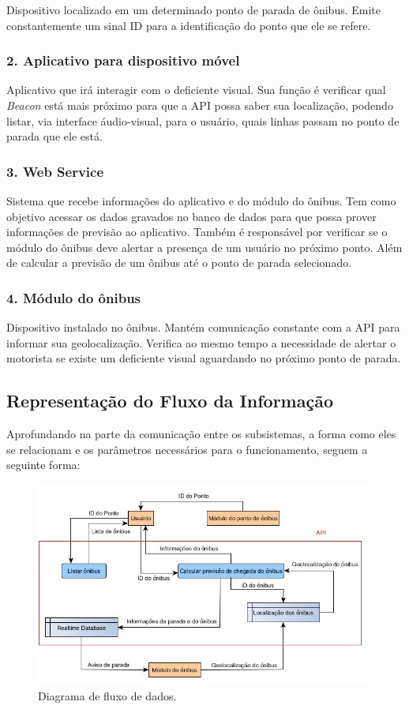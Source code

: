 \documentclass[
	12pt,				%
	oneside,			%
	a4paper,			%
	brazil				%
]{abntex2}
\begin{document}
Dispositivo localizado em um determinado ponto de parada de ônibus. Emite constantemente um sinal ID para a identificação do ponto que ele se refere.

\subsubsection*{2. Aplicativo para dispositivo móvel}

Aplicativo que irá interagir com o deficiente visual. Sua função é verificar qual \textit{Beacon} está mais próximo para que a API possa saber sua localização, podendo listar, via interface áudio-visual, para o usuário, quais linhas passam no ponto de parada que ele está.

\subsubsection*{3. Web Service}

Sistema que recebe informações do aplicativo e do módulo do ônibus. Tem como objetivo acessar os dados gravados no banco de dados para que possa prover informações de previsão ao aplicativo. Também é responsável por verificar se o módulo do ônibus deve alertar a presença de um usuário no próximo ponto. Além de calcular a previsão de um ônibus até o ponto de parada selecionado.

\subsubsection*{4. Módulo do ônibus}

Dispositivo instalado no ônibus. Mantém comunicação constante com a API para informar sua geolocalização. Verifica ao mesmo tempo a necessidade de alertar o motorista se existe um deficiente visual aguardando no próximo ponto de parada.



\subsection{Representação do Fluxo da Informação}

Aprofundando na parte da comunicação entre os subsistemas, a forma como eles se relacionam e os parâmetros necessários para o funcionamento, seguem a seguinte forma:

\begin{figure}[H]
\centering
\includegraphics[width=11cm, center]{images/data-flux.jpg}
\caption{Diagrama de fluxo de dados.}
\label{Rotulo}
\end{figure}
\end{document}
